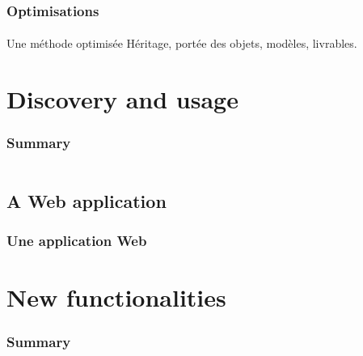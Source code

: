\documentclass[]{beamer}
\begin{document}
\begin{frame}
    \frametitle{Optimisations}
    \framesubtitle{}
    \begin{block}{Une méthode optimisée}
    Héritage, portée des objets, modèles, livrables.
    \end{block}
\end{frame}








%
%
\section{Discovery and usage}
\begin{frame}
    \frametitle{Summary}
    \begin{columns}[t]
        \begin{column}{5cm}
            \tableofcontents[sections={1-3}, currentsection, hideothersubsections]
        \end{column}
        \begin{column}{5cm}
            \tableofcontents[sections={4-5}, currentsection, hideothersubsections]
        \end{column}
    \end{columns}
\end{frame}
\subsection{A Web application}
\begin{frame}
    \frametitle{Une application Web}
    \framesubtitle{}
\end{frame}







%
%
\section{New functionalities}
\begin{frame}
    \frametitle{Summary}
    \begin{columns}[t]
        \begin{column}{5cm}
            \tableofcontents[sections={1-3}, currentsection, hideothersubsections]
        \end{column}
        \begin{column}{5cm}
            \tableofcontents[sections={4-5}, currentsection, hideothersubsections]
        \end{column}
    \end{columns}
\end{frame}
\end{document}
